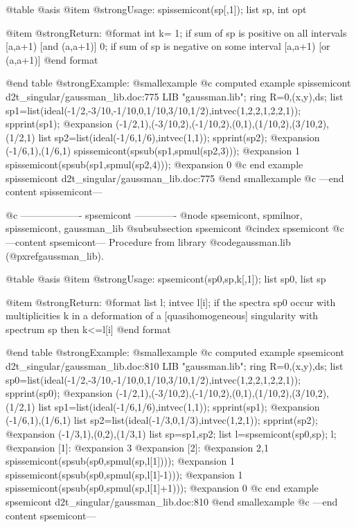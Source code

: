 @table @asis
@item @strong{Usage:}
spissemicont(sp[,1]); list sp, int opt

@item @strong{Return:}
@format
int k=
  1;  if sum of sp is positive on all intervals [a,a+1) [and (a,a+1)]
  0;  if sum of sp is negative on some interval [a,a+1) [or (a,a+1)]
@end format

@end table
@strong{Example:}
@smallexample
@c computed example spissemicont d2t_singular/gaussman_lib.doc:775 
LIB "gaussman.lib";
ring R=0,(x,y),ds;
list sp1=list(ideal(-1/2,-3/10,-1/10,0,1/10,3/10,1/2),intvec(1,2,2,1,2,2,1));
spprint(sp1);
@expansion{} (-1/2,1),(-3/10,2),(-1/10,2),(0,1),(1/10,2),(3/10,2),(1/2,1)
list sp2=list(ideal(-1/6,1/6),intvec(1,1));
spprint(sp2);
@expansion{} (-1/6,1),(1/6,1)
spissemicont(spsub(sp1,spmul(sp2,3)));
@expansion{} 1
spissemicont(spsub(sp1,spmul(sp2,4)));
@expansion{} 0
@c end example spissemicont d2t_singular/gaussman_lib.doc:775
@end smallexample
@c ---end content spissemicont---

@c ------------------- spsemicont -------------
@node spsemicont, spmilnor, spissemicont, gaussman_lib
@subsubsection spsemicont
@cindex spsemicont
@c ---content spsemicont---
Procedure from library @code{gaussman.lib} (@pxref{gaussman_lib}).

@table @asis
@item @strong{Usage:}
spsemicont(sp0,sp,k[,1]); list sp0, list sp

@item @strong{Return:}
@format
list l;
  intvec l[i];  if the spectra sp0 occur with multiplicities k
                in a deformation of a [quasihomogeneous] singularity
                with spectrum sp then k<=l[i]
@end format

@end table
@strong{Example:}
@smallexample
@c computed example spsemicont d2t_singular/gaussman_lib.doc:810 
LIB "gaussman.lib";
ring R=0,(x,y),ds;
list sp0=list(ideal(-1/2,-3/10,-1/10,0,1/10,3/10,1/2),intvec(1,2,2,1,2,2,1));
spprint(sp0);
@expansion{} (-1/2,1),(-3/10,2),(-1/10,2),(0,1),(1/10,2),(3/10,2),(1/2,1)
list sp1=list(ideal(-1/6,1/6),intvec(1,1));
spprint(sp1);
@expansion{} (-1/6,1),(1/6,1)
list sp2=list(ideal(-1/3,0,1/3),intvec(1,2,1));
spprint(sp2);
@expansion{} (-1/3,1),(0,2),(1/3,1)
list sp=sp1,sp2;
list l=spsemicont(sp0,sp);
l;
@expansion{} [1]:
@expansion{}    3
@expansion{} [2]:
@expansion{}    2,1
spissemicont(spsub(sp0,spmul(sp,l[1])));
@expansion{} 1
spissemicont(spsub(sp0,spmul(sp,l[1]-1)));
@expansion{} 1
spissemicont(spsub(sp0,spmul(sp,l[1]+1)));
@expansion{} 0
@c end example spsemicont d2t_singular/gaussman_lib.doc:810
@end smallexample
@c ---end content spsemicont---

